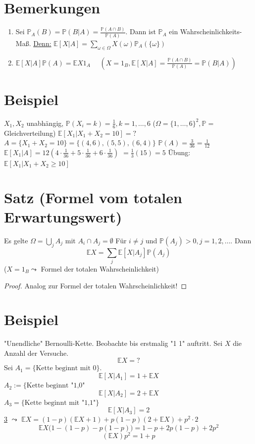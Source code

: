 \documentclass[a4paper,11pt,notitlepage]{report}
\newcommand{\Prim}{{\ensuremath{\mathbb{P}}}}
\newcommand{\E}{{\ensuremath{\mathbb{E}}}}
\begin{document}
\section{Bemerkungen}
\label{13.2}
\begin{enumerate}
	\item Sei $\Prim_A(B) = \Prim(B | A) = \frac{\Prim(A \cap B)}{\Prim(A)}.$
	Dann ist $\Prim_A$ ein Wahrscheinlichkeits-Maß.
	\newline
	\underline{Denn:} $\E [X|A] = \sum\limits_{\omega \in \Omega}{X(\omega) \Prim_A(\{\omega\})}$
	\item $\E [X | A] \Prim(A) = \E X 1_A$
	$\quad \left(X=1_B, \E [X|A] = \frac{\Prim(A \cap B)}{\Prim(A)} = \Prim(B|A)\right)$
\end{enumerate}

\section{Beispiel}
$X_1, X_2$ unabhängig, $\Prim(X_i = k) = \frac{1}{6}, k = 1, \ldots, 6$ ($\Omega = \{1, \ldots, 6\}^2, \Prim= $ Gleichverteilung)
\newline
$\E [X_1 | X_1 + X_2 = 10] = ?$
\newline
$A = \{X_1 + X_2 = 10\} = \{(4,6),(5,5),(6,4)\}$
\newline
$\Prim(A) = \frac{3}{36} = \frac{1}{12}$
\newline
$\E [X_1 | A] = 12 (4 \cdot \frac{1}{36} + 5 \cdot \frac{1}{36} + 6 \cdot \frac{1}{36})$
\newline
$= \frac{1}{3} (15) = 5$
\newline
Übung: $\E [X_1 | X_1 + X_2 \geq 10]$

\section{Satz (Formel vom totalen Erwartungswert)} \label{13.4}
Es gelte $\Omega = \bigcup\limits_{j}{A_j}$ mit $A_i \cap A_j = \emptyset$
Für $i \neq j$ und $\Prim(A_j) > 0, j = 1, 2, \ldots$. Dann
$$\E X = \sum\limits_{j}{\E [X | A_j] \Prim(A_j)}$$
($X=1_B \leadsto $ Formel der totalen Wahrscheinlichkeit)

\begin{proof}
	Analog zur Formel der totalen Wahrscheinlichkeit!
\end{proof}

\section{Beispiel}
"Unendliche" Bernoulli-Kette. \newline
Beobachte bis erstmalig "1 1" auftritt. Sei $X$ die Anzahl der Versuche.
$$\E X = ?$$
Sei $A_1 = \{\text{Kette beginnt mit $0$}\}$.
$$\E [X|A_1] = 1 + \E X$$
$A_2 := \{\text{Kette beginnt "1,0"}$
$$\E [X|A_2] = 2 + \E X$$
$A_3 = \{\text{Kette beginnt mit "1,1"}\}$
$$\E [X | A_3] = 2$$
\ref{13.4} $\leadsto$ $\E X = (1-p) (\E X + 1) + p (1-p) (2 + \E X) + p^2 \cdot 2$
$$\E X \big(1 - (1-p) - p (1-p)\big) = 1-p + 2 p (1-p) + 2 p^2$$
$$(\E X) p^2 = 1+p $$
\end{document}
